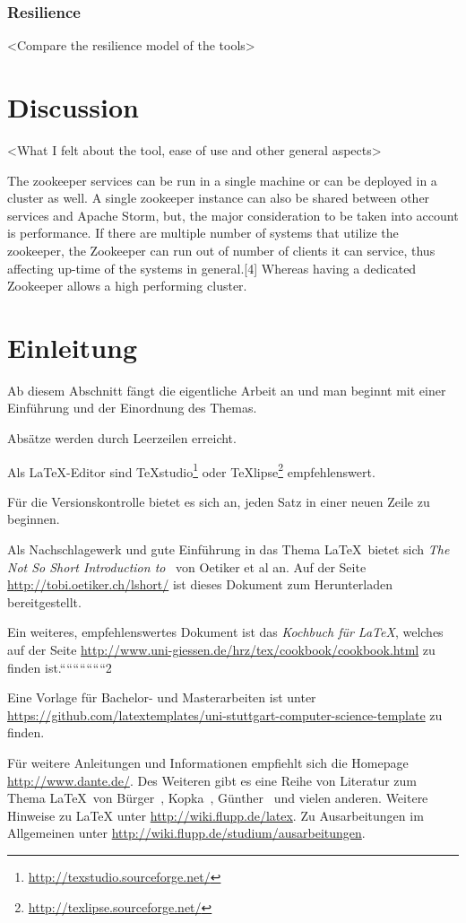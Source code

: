 \documentclass[runningheads,a4paper]{llncs}[2015/06/24]
\begin{document}
 \subsubsection{Resilience}
 <Compare the resilience model of the tools>
 
 \section{Discussion}
<What I felt about the tool, ease of use and other general aspects> 
 
 
 The zookeeper services can be run in a single machine or can be deployed in a cluster as well. A single zookeeper instance can also be shared between other services and Apache Storm, but, the major consideration to be taken into account is performance. If there are multiple number of systems that utilize the zookeeper, the Zookeeper can run out of number of clients it can service, thus affecting up-time of the systems in general.[4] Whereas having a dedicated Zookeeper allows a high performing cluster.

\section{Einleitung}
Ab diesem Abschnitt fängt die eigentliche Arbeit an und man beginnt mit einer Einführung und der Einordnung des Themas.

Absätze werden durch Leerzeilen erreicht.

Als \LaTeX-Editor sind TeXstudio\footnote{\url{http://texstudio.sourceforge.net/}} oder TeXlipse\footnote{\url{http://texlipse.sourceforge.net/}} empfehlenswert.

Für die Versionskontrolle bietet es sich an, jeden Satz in einer neuen Zeile zu beginnen.

Als Nachschlagewerk und gute Einführung in das Thema \LaTeX\ bietet sich \emph{The Not So Short Introduction to \LaTeXe}\ von Oetiker et al an.
Auf der Seite \url{http://tobi.oetiker.ch/lshort/} ist dieses Dokument zum Herunterladen bereitgestellt.

Ein weiteres, empfehlenswertes Dokument ist das \emph{Kochbuch für \LaTeX{}}, welches auf der Seite \url{http://www.uni-giessen.de/hrz/tex/cookbook/cookbook.html} zu finden ist.``````````````2

Eine Vorlage für Bachelor- und Masterarbeiten ist unter \url{https://github.com/latextemplates/uni-stuttgart-computer-science-template} zu finden.

Für weitere Anleitungen und Informationen empfiehlt sich die Homepage \url{http://www.dante.de/}.
Des Weiteren gibt es eine Reihe von Literatur zum Thema \LaTeX\ von Bürger~\cite{buerger}, Kopka~\cite{kopka}, Günther~\cite{guenther} und vielen anderen.
Weitere Hinweise zu \LaTeX{} unter \url{http://wiki.flupp.de/latex}.
Zu Ausarbeitungen im Allgemeinen unter \url{http://wiki.flupp.de/studium/ausarbeitungen}.
\end{document}
